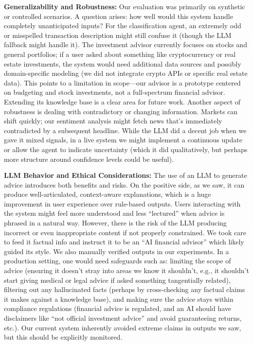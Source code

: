 \documentclass{scrartcl}
\begin{document}
\textbf{Generalizability and Robustness:} Our evaluation was primarily on synthetic or controlled scenarios. A question arises: how well would this system handle completely unanticipated inputs? For the classification agent, an extremely odd or misspelled transaction description might still confuse it (though the LLM fallback might handle it). The investment advisor currently focuses on stocks and general portfolios; if a user asked about something like cryptocurrency or real estate investments, the system would need additional data sources and possibly domain-specific modeling (we did not integrate crypto APIs or specific real estate data). This points to a limitation in scope—our advisor is a prototype centered on budgeting and stock investments, not a full-spectrum financial advisor. Extending its knowledge base is a clear area for future work. Another aspect of robustness is dealing with contradictory or changing information. Markets can shift quickly; our sentiment analysis might fetch news that's immediately contradicted by a subsequent headline. While the LLM did a decent job when we gave it mixed signals, in a live system we might implement a continuous update or allow the agent to indicate uncertainty (which it did qualitatively, but perhaps more structure around confidence levels could be useful).

\textbf{LLM Behavior and Ethical Considerations:} The use of an LLM to generate advice introduces both benefits and risks. On the positive side, as we saw, it can produce well-articulated, context-aware explanations, which is a huge improvement in user experience over rule-based outputs. Users interacting with the system might feel more understood and less “lectured” when advice is phrased in a natural way. However, there is the risk of the LLM producing incorrect or even inappropriate content if not properly constrained. We took care to feed it factual info and instruct it to be an “AI financial advisor” which likely guided its style. We also manually verified outputs in our experiments. In a production setting, one would need safeguards such as: limiting the scope of advice (ensuring it doesn’t stray into areas we know it shouldn’t, e.g., it shouldn’t start giving medical or legal advice if asked something tangentially related), filtering out any hallucinated facts (perhaps by cross-checking any factual claims it makes against a knowledge base), and making sure the advice stays within compliance regulations (financial advice is regulated, and an AI should have disclaimers like “not official investment advice” and avoid guaranteeing returns, etc.). Our current system inherently avoided extreme claims in outputs we saw, but this should be explicitly monitored.
\end{document}
